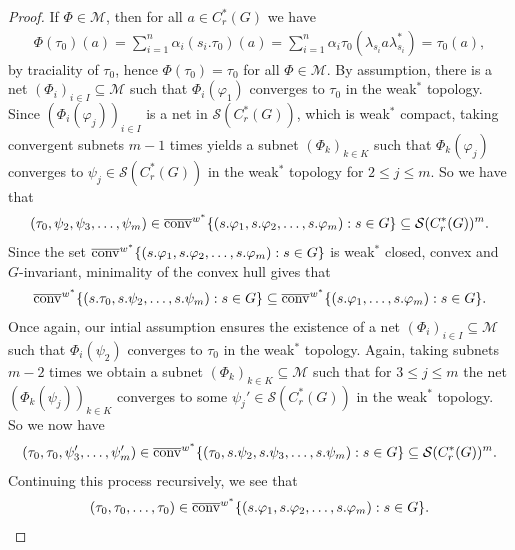 \begin{theorem}
\begin{proof}
\noindent If $\Phi \in \mathcal{M}$,  then for all $a \in C_r^*(G)$ we have
\begin{align*}
\Phi(\tau_0)(a)= \sum_{i=1}^n \alpha_i (s_i . \tau_0) (a)=\sum_{i=1}^n \alpha_i \tau_0(\lambda_{s_i} a \lambda_{s_i}^*) = \tau_0(a),
\end{align*}
by traciality of $\tau_0$, hence $\Phi(\tau_0)=\tau_0$ for all $\Phi \in \mathcal{M}$. By assumption, there is a net $(\Phi_{i})_{i \in I} \subseteq \mathcal{M}$ such that $\Phi_i(\varphi_1)$ converges to $\tau_0$ in the weak$^*$ topology. Since $(\Phi_i(\varphi_{j}))_{i \in I}$ is a net in $\mathcal{S}(C_r^*(G))$, which is weak$^*$ compact, taking convergent subnets $m-1$ times yields a subnet $(\Phi_k)_{k \in K}$ such that $\Phi_{k}(\varphi_j)$ converges to $\psi_j\in \mathcal{S}(C_r^* (G))$ in the weak$^*$ topology for $2 \leq j \leq m$. So we have that
\begin{align*}
(\tau_0,\psi_2,\psi_3,\dots,\psi_m) \in \overline{\operatorname{conv}}^{w^*}\{(s. \varphi_1,s.\varphi_2,\dots,s.\varphi_m) : s \in G\} \subseteq \mathcal{S}(C_r^*(G))^m.
\end{align*}
Since the set $\overline{\operatorname{conv}}^{w^*}\{(s. \varphi_1,s.\varphi_2,\dots,s.\varphi_m) : s \in G\}$ is weak$^*$ closed, convex and $G$-invariant, minimality of the convex hull gives that
\begin{align*}
\overline{\operatorname{conv}}^{w^*} \{ (s.\tau_0, s. \psi_2, \dots , s. \psi_m) : s \in G\} \subseteq \overline{\operatorname{conv}}^{w^*}\{ (s. \varphi_1,\dots,s.\varphi_m) : s \in G\}.
\end{align*}
Once again, our intial assumption ensures the existence of a net $(\Phi_{i})_{i \in I} \subseteq \mathcal{M}$ such that $\Phi_i(\psi_2)$ converges to $\tau_0$ in the weak$^*$ topology. Again, taking subnets $m-2$ times we obtain a subnet $(\Phi_{k})_{k \in K} \subseteq \mathcal{M}$ such that for $3 \leq j \leq m$ the net $(\Phi_k(\psi_j))_{k \in K}$ converges to some $\psi_j' \in \mathcal{S}(C_r^*(G))$ in the weak$^*$ topology. So we now have
\begin{align*}
(\tau_0, \tau_0, \psi_3 ', \dots ,\psi_m ') \in \overline{\operatorname{conv}}^{w^*}\{(\tau_0, s.\psi_2, s.\psi_3 , \dots , s.\psi_m) : s \in G\}  \subseteq \mathcal{S}(C_r^*(G))^m.
\end{align*}
Continuing this process recursively, we see that
\begin{align*}
(\tau_0,\tau_0,\dots,\tau_0) \in \overline{\operatorname{conv}}^{w^*}\{(s. \varphi_1, s. \varphi_2, \dots , s. \varphi_m) : s \in G\}.
\end{align*}


\end{proof}
\end{theorem}
